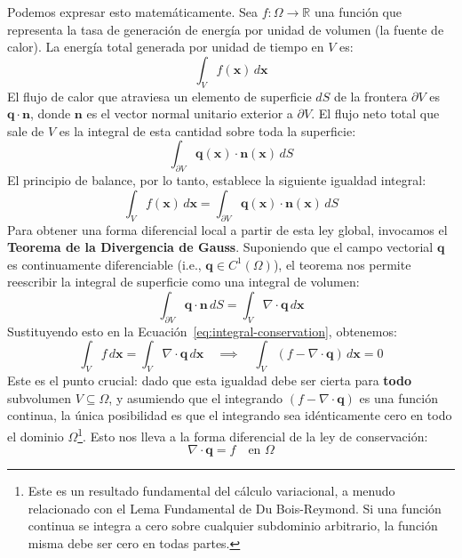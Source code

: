 Podemos expresar esto matemáticamente. Sea \(f: \Omega \to \mathbb{R}\) una función que representa la tasa de generación de energía por unidad de volumen (la fuente de calor). La energía total generada por unidad de tiempo en \(V\) es:
\[
\int_V f(\bm{x}) \, d\bm{x}
\]
El flujo de calor que atraviesa un elemento de superficie \(dS\) de la frontera \(\partial V\) es \(\bm{q} \cdot \bm{n}\), donde \(\bm{n}\) es el vector normal unitario exterior a \(\partial V\). El flujo neto total que sale de \(V\) es la integral de esta cantidad sobre toda la superficie:
\[
\int_{\partial V} \bm{q}(\bm{x}) \cdot \bm{n}(\bm{x}) \, dS
\]
El principio de balance, por lo tanto, establece la siguiente igualdad integral:
\begin{equation}
    \int_V f(\bm{x}) \, d\bm{x} = \int_{\partial V} \bm{q}(\bm{x}) \cdot \bm{n}(\bm{x}) \, dS
    \label{eq:integral-conservation}
\end{equation}
Para obtener una forma diferencial local a partir de esta ley global, invocamos el \textbf{Teorema de la Divergencia de Gauss}. Suponiendo que el campo vectorial \(\bm{q}\) es continuamente diferenciable (i.e., \(\bm{q} \in C^1(\Omega)\)), el teorema nos permite reescribir la integral de superficie como una integral de volumen:
\[
\int_{\partial V} \bm{q} \cdot \bm{n} \, dS = \int_V \nabla \cdot \bm{q} \, d\bm{x}
\]
Sustituyendo esto en la Ecuación~\eqref{eq:integral-conservation}, obtenemos:
\[
\int_V f \, d\bm{x} = \int_V \nabla \cdot \bm{q} \, d\bm{x} \quad \implies \quad \int_V (f - \nabla \cdot \bm{q}) \, d\bm{x} = 0
\]
Este es el punto crucial: dado que esta igualdad debe ser cierta para \textbf{todo} subvolumen \(V \subseteq \Omega\), y asumiendo que el integrando \((f - \nabla \cdot \bm{q})\) es una función continua, la única posibilidad es que el integrando sea idénticamente cero en todo el dominio \(\Omega\)\footnote{Este es un resultado fundamental del cálculo variacional, a menudo relacionado con el Lema Fundamental de Du Bois-Reymond. Si una función continua se integra a cero sobre cualquier subdominio arbitrario, la función misma debe ser cero en todas partes.}. Esto nos lleva a la forma diferencial de la ley de conservación:
\begin{equation}
    \nabla \cdot \bm{q} = f \quad \text{en } \Omega
    \label{eq:conservation-law}
\end{equation}

